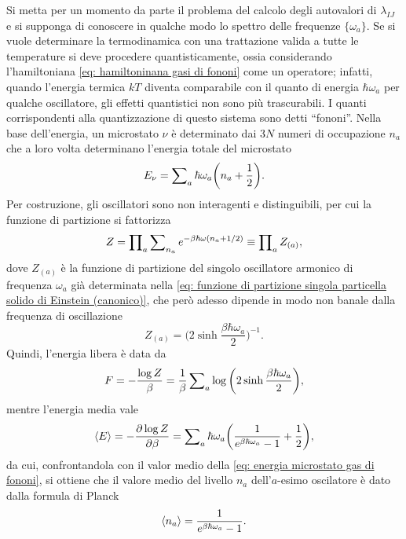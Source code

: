 Si metta per un momento da parte il problema del calcolo degli autovalori di $\lambda_{IJ}$ e si supponga di conoscere in qualche modo lo spettro delle frequenze $\{\omega_a\}$. Se si vuole determinare la termodinamica con una trattazione valida a tutte le temperature si deve procedere quantisticamente, ossia considerando l'hamiltoniana \eqref{eq: hamiltoninana gasi di fononi} come un operatore; infatti, quando l'energia termica $kT$ diventa comparabile con il quanto di energia $\hbar\omega_a$ per qualche oscillatore, gli effetti quantistici non sono più trascurabili. I quanti corrispondenti alla quantizzazione di questo sistema sono detti ``fononi''. Nella base dell'energia, un microstato $\nu$ è determinato dai $3N$ numeri di occupazione $n_a$ che a loro volta determinano l'energia totale del microstato
\begin{equation}
\label{eq: energia microstato gas di fononi}
    E_\nu = \sum\nolimits_a \hbar\omega_a\bigg(n_a + \frac{1}{2}\bigg).
\end{equation}
Per costruzione, gli oscillatori sono non interagenti e distinguibili, per cui la funzione di partizione si fattorizza 
\begin{equation}
    Z = \prod\nolimits_a\sum\nolimits_{n_a} e^{-\beta\hbar\omega(n_a + 1/2)} \equiv \prod\nolimits_a Z_{(a)},
\end{equation}
dove $Z_{(a)}$ è la funzione di partizione del singolo oscillatore armonico di frequenza $\omega_a$ già determinata nella \eqref{eq: funzione di partizione singola particella solido di Einstein (canonico)}, che però adesso dipende in modo non banale dalla frequenza di oscillazione
\begin{equation}
    Z_{(a)} = \bigg(2\sinh{\frac{\beta\hbar\omega_a}{2}}\bigg)^{-1}.
\end{equation}
Quindi, l'energia libera è data da 
\begin{equation}
    F = -\frac{\log{Z}}{\beta} = \frac{1}{\beta}\sum\nolimits_a\log{\bigg(2\sinh{\frac{\beta\hbar\omega_a}{2}}\bigg)},
\end{equation}
mentre l'energia media vale
\begin{equation}
    \langle E \rangle = -\frac{\partial\log{Z}}{\partial\beta} = \sum\nolimits_a\hbar\omega_a\bigg(\frac{1}{e^{\beta\hbar\omega_a} - 1} + \frac{1}{2}\bigg),
\end{equation}
da cui, confrontandola con il valor medio della \eqref{eq: energia microstato gas di fononi}, si ottiene che il valore medio del livello $n_a$ dell'$a$-esimo oscilatore è dato dalla formula di Planck
\begin{equation}
\label{eq: formula di Planck}
    \langle n_a \rangle = \frac{1}{e^{\beta\hbar\omega_a} - 1}.
\end{equation}
